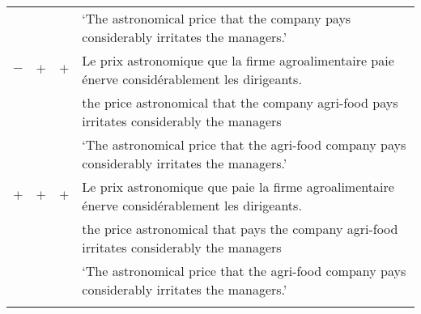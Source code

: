 \documentclass[output=paper]{langscibook}
\begin{document}
\begin{sidewaystable}
\begin{tabular}{cccl}
& & & `The astronomical price that  the company pays considerably irritates the managers.'\\
$-$ & $+$ & $+$  &	Le prix astronomique que la firme agroalimentaire paie énerve considérablement les dirigeants.\\
& & & the price astronomical that the company agri-food  pays irritates considerably the managers \\
& & & `The astronomical price that the agri-food company pays considerably irritates the managers.'\\
 $+$ & $+$ & $+$  &	Le prix astronomique que paie la firme agroalimentaire énerve considérablement les dirigeants.\\
& & & the price astronomical that pays the company agri-food irritates considerably the managers \\
& & & `The astronomical price that  the agri-food company pays considerably irritates the managers.'\\
  \lspbottomrule
 \end{tabular}
 

\end{sidewaystable}
\end{document}
